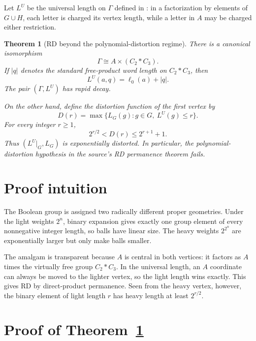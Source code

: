 \documentclass[11pt]{article}
\newtheorem{theorem}{Theorem}
\begin{document}
Let $L^U$ be the universal length on $\Gamma$ defined in \cite{KPT}: in a
factorization by elements of $G\cup H$, each letter is charged its vertex
length, while a letter in $A$ may be charged either restriction.

\begin{theorem}[RD beyond the polynomial-distortion regime]\label{thm:main}
There is a canonical isomorphism
\begin{equation}\label{eq:group-id}
                 \Gamma\cong A\times(C_2*C_3).
\end{equation}
If $|q|$ denotes the standard free-product word length on $C_2*C_3$, then
\begin{equation}\label{eq:universal}
                 L^U(a,q)=\ell_0(a)+|q|.
\end{equation}
The pair $(\Gamma,L^U)$ has rapid decay.

On the other hand, define the distortion function of the first vertex by
\[
 D(r)=\max\{L_G(g):g\in G,\ L^U(g)\le r\}.
\]
For every integer $r\ge1$,
\begin{equation}\label{eq:distortion}
                   2^{r/2}<D(r)\le2^{r+1}+1.
\end{equation}
Thus $(L^U|_G,L_G)$ is exponentially distorted.  In particular, the
polynomial-distortion hypothesis in the source's RD permanence theorem fails.
\end{theorem}

\section{Proof intuition}

The Boolean group is assigned two radically different proper geometries.
Under the light weights $2^n$, binary expansion gives exactly one group
element of every nonnegative integer length, so balls have linear size.  The
heavy weights $2^{2^n}$ are exponentially larger but only make balls smaller.

The amalgam is transparent because $A$ is central in both vertices: it factors
as $A$ times the virtually free group $C_2*C_3$.  In the universal length, an
$A$ coordinate can always be moved to the lighter vertex, so the light length
wins exactly.  This gives RD by direct-product permanence.  Seen from the
heavy vertex, however, the binary element of light length $r$ has heavy length
at least $2^{r/2}$.

\section{Proof of Theorem~\ref{thm:main}}
\end{document}
